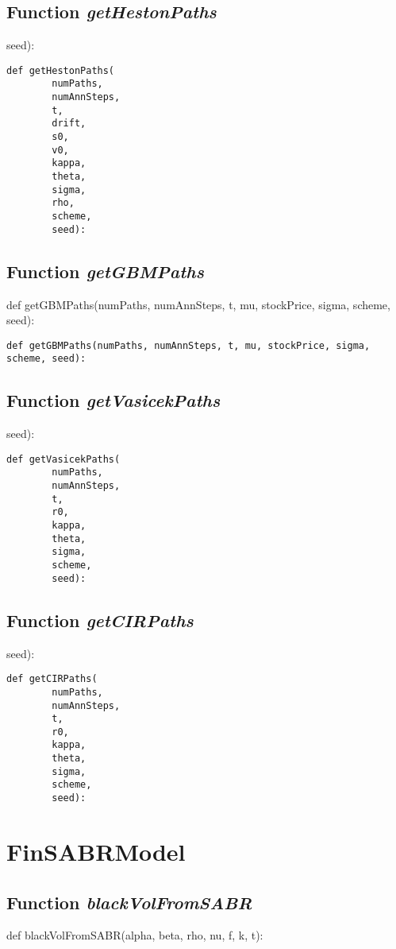 \documentclass[twoside,11pt]{book}
\begin{document}
\subsection{Function {\it getHestonPaths}}
seed):

\begin{lstlisting}
def getHestonPaths(
        numPaths,
        numAnnSteps,
        t,
        drift,
        s0,
        v0,
        kappa,
        theta,
        sigma,
        rho,
        scheme,
        seed):
\end{lstlisting}

\subsection{Function {\it getGBMPaths}}
def getGBMPaths(numPaths, numAnnSteps, t, mu, stockPrice, sigma, scheme, seed):

\begin{lstlisting}
def getGBMPaths(numPaths, numAnnSteps, t, mu, stockPrice, sigma, scheme, seed):
\end{lstlisting}

\subsection{Function {\it getVasicekPaths}}
seed):

\begin{lstlisting}
def getVasicekPaths(
        numPaths,
        numAnnSteps,
        t,
        r0,
        kappa,
        theta,
        sigma,
        scheme,
        seed):
\end{lstlisting}

\subsection{Function {\it getCIRPaths}}
seed):

\begin{lstlisting}
def getCIRPaths(
        numPaths,
        numAnnSteps,
        t,
        r0,
        kappa,
        theta,
        sigma,
        scheme,
        seed):
\end{lstlisting}

\newpage
\section{FinSABRModel}

\subsection{Function {\it blackVolFromSABR}}
def blackVolFromSABR(alpha, beta, rho, nu, f, k, t):
\end{document}
